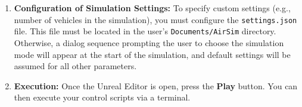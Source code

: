 \begin{enumerate}[label=\textbf{Step \arabic*:}, leftmargin=*]
    \item \textbf{Configuration of Simulation Settings:} To specify custom settings (e.g., number of vehicles in the simulation), you must configure the \texttt{settings.json} file. This file must be located in the user's \texttt{Documents/AirSim} directory. Otherwise, a dialog sequence prompting the user to choose the simulation mode will appear at the start of the simulation, and default settings will be assumed for all other parameters. 
    
    \item \textbf{Execution:} Once the Unreal Editor is open, press the \textbf{Play} button. You can then execute your control scripts via a terminal. 
\end{enumerate}